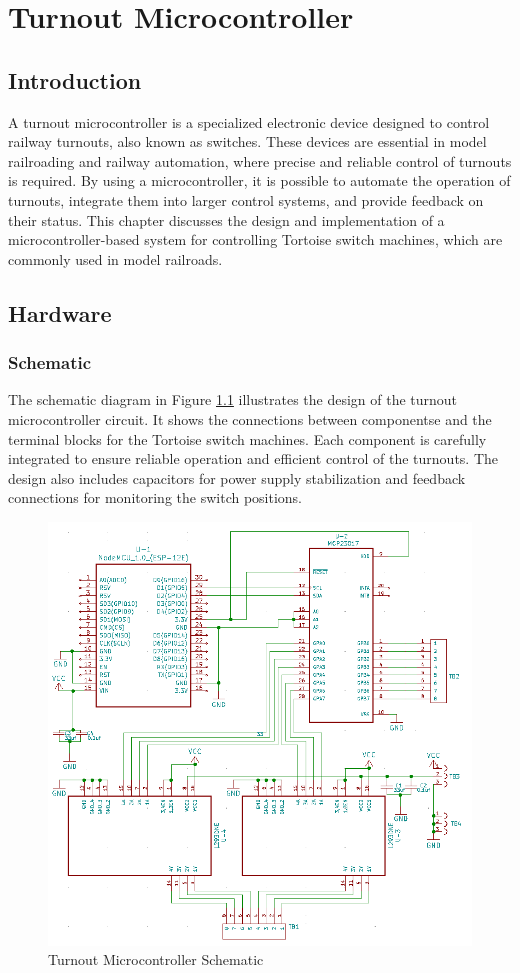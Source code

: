 \chapter{Turnout Microcontroller}
\section{Introduction}
A turnout microcontroller is a specialized electronic device designed to control railway turnouts, also known as switches. These devices are essential in model railroading and railway automation, where precise and reliable control
of turnouts is required. By using a microcontroller, it is possible to automate the operation of turnouts, integrate them into larger control systems, and provide feedback on their status. This chapter discusses the design and
implementation of a microcontroller-based system for controlling Tortoise switch machines, which are commonly used in model railroads.
\section{Hardware}
\subsection{Schematic}
The schematic diagram in Figure \ref{fig:turnout-schematic} illustrates the design of the turnout microcontroller circuit. It shows the connections between componentse and the terminal blocks for the Tortoise switch machines. 
Each component is carefully integrated to ensure reliable operation and efficient control of the turnouts. The design also includes capacitors for power supply stabilization and feedback connections for monitoring the switch positions.

\begin{figure}[H]
  \centering
    \includegraphics[scale=0.45]{turnout_schematic.png}
  \caption{Turnout Microcontroller Schematic}
  \label{fig:turnout-schematic}
\end{figure}

